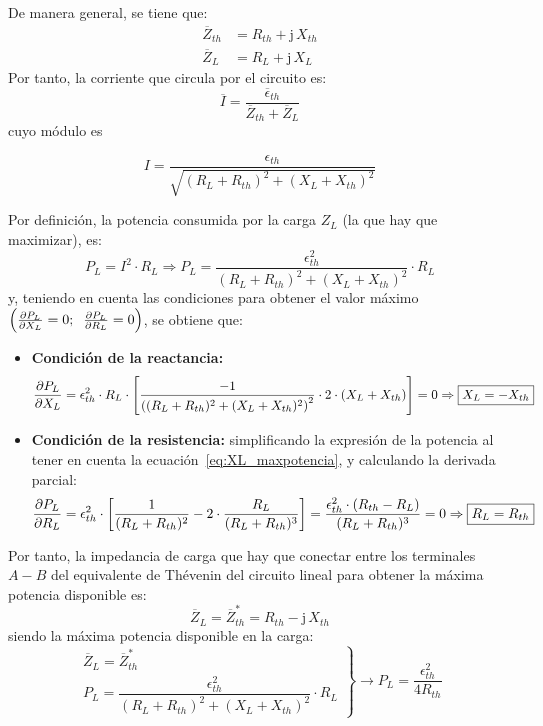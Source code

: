 De manera general, se tiene que:
\begin{align*}
  \overline{Z}_{th} &= R_{th} + \mathrm{j}\,X_{th}\\
  \overline{Z}_L &= R_L + \mathrm{j}\,X_L
\end{align*}
Por tanto, la corriente que circula por el circuito es:
\begin{equation*}
  \overline{I} = \frac{\overline{\epsilon}_{th}}{\overline{Z}_{th} + \overline{Z}_L}
\end{equation*}
cuyo módulo es

\begin{equation*}
  I=\frac{\epsilon_{th}}{\sqrt{(R_L+R_{th})^2+(X_L+X_{th})^2}}
\end{equation*}

Por definición, la potencia consumida por la carga $Z_L$ (la que hay que
maximizar), es:
\begin{equation*}
  P_L= I^2 \cdot R_L\Rightarrow P_L = \dfrac{\epsilon_{th}^2}{{(R_L+R_{th})^2+(X_L+X_{th})^2}} \cdot R_L
\end{equation*}
y, teniendo en cuenta las condiciones para obtener el valor máximo
$\left(\diffp{P_L}{X_L} = 0;\;\; \diffp{P_L}{R_L} = 0\right)$, se
obtiene que:
\begin{itemize}
\item \textbf{Condición de la reactancia:}
  \begin{equation}\label{eq:XL_maxpotencia}
    \diffp{P_L}{X_L} = \epsilon^2_{th} \cdot R_L \cdot \left[\frac{-1}{\left((R_L + R_{th})^2 + (X_L + X_{th})^2\right)^2} \cdot 2 \cdot (X_L + X_{th})\right]=0\Rightarrow \boxed{X_L = - X_{th}}
  \end{equation}
\item \textbf{Condición de la resistencia:} simplificando la expresión
  de la potencia al tener en cuenta la
  ecuación~\eqref{eq:XL_maxpotencia}, y calculando la derivada
  parcial:
  \begin{equation}\label{eq:R_maxpotencia}
    \diffp{P_L}{R_L} = \epsilon^2_{th} \cdot \left[\frac{1}{(R_L + R_{th})^2} - 2 \cdot \frac{R_L}{(R_L + R_{th})^3}\right]= \frac{\epsilon^2_{th} \cdot (R_{th} - R_L)}{(R_L + R_{th})^3}=0\Rightarrow \boxed{R_L = R_{th}}
  \end{equation}
\end{itemize}
Por tanto, la impedancia de carga que hay que conectar entre los
terminales $A-B$ del equivalente de Thévenin del circuito lineal para
obtener la máxima potencia disponible es:
\begin{equation}
  \boxed{\overline{Z}_L = \overline{Z}_{th}^*=R_{th}-\mathrm{j}\,X_{th}}
\end{equation}
siendo la máxima potencia disponible en la carga:
\begin{equation}
  \left.
    \begin{matrix}
      \overline{Z}_L = \overline{Z}_{th}^*\\
      P_L = \dfrac{\epsilon_{th}^2}{{(R_L+R_{th})^2+(X_L+X_{th})^2}} \cdot R_L
    \end{matrix} \right\}\rightarrow
  \boxed{P_L = \frac{\epsilon^2_{th}}{4 R_{th}}}
\end{equation}


